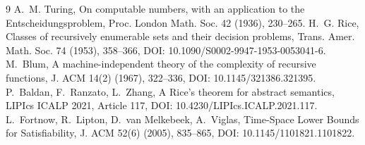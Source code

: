\documentclass[11pt]{article}
\begin{document}
\begin{thebibliography}{9}
 A.~M. Turing, On computable numbers, with an application to the Entscheidungsproblem, Proc. London Math. Soc. 42 (1936), 230--265.
 H.~G. Rice, Classes of recursively enumerable sets and their decision problems, Trans. Amer. Math. Soc. 74 (1953), 358--366, DOI: 10.1090/S0002-9947-1953-0053041-6.
 M.~Blum, A machine-independent theory of the complexity of recursive functions, J. ACM 14(2) (1967), 322--336, DOI: 10.1145/321386.321395.
 P.~Baldan, F.~Ranzato, L.~Zhang, A Rice's theorem for abstract semantics, LIPIcs ICALP 2021, Article 117, DOI: 10.4230/LIPIcs.ICALP.2021.117.
 L.~Fortnow, R.~Lipton, D.~van Melkebeek, A.~Viglas, Time-Space Lower Bounds for Satisfiability, J. ACM 52(6) (2005), 835--865, DOI: 10.1145/1101821.1101822.
\end{thebibliography}
\end{document}
